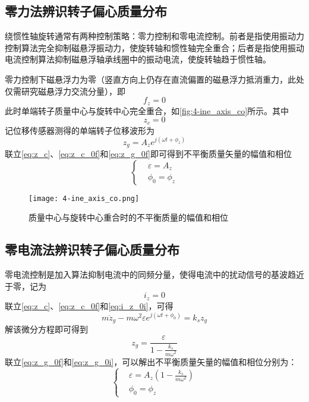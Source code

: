 \subsection{零力法辨识转子偏心质量分布}

绕惯性轴旋转通常有两种控制策略：零力控制和零电流控制。前者是指使用振动力控制算法完全抑制磁悬浮振动力，使旋转轴和惯性轴完全重合；后者是指使用振动电流控制算法抑制磁悬浮轴承线圈中的振动电流，使旋转轴趋于惯性轴。

零力控制下磁悬浮力为零（竖直方向上仍存在直流偏置的磁悬浮力抵消重力，此处仅需研究磁悬浮力交流分量），即
\begin{equation}
	\label{eq:f_z_0f}
	f_z = 0
\end{equation}
此时单端转子质量中心与旋转中心完全重合，如\autoref{fig:4-ine_axis_co}所示。其中
\begin{equation}
	\label{eq:z_c_0f}
	z_c = 0
\end{equation}
记位移传感器测得的单端转子位移波形为
\begin{equation}
	\label{eq:z_g_0f}
	z_g = A_ze^{j(\omega t + \phi _z)}
\end{equation}
联立\autoref{eq:z_c}、\autoref{eq:z_c_0f}和\autoref{eq:z_g_0f}即可得到不平衡质量矢量的幅值和相位
\begin{equation}
\left\{
\begin{aligned}
& \varepsilon = A_z\\
& \phi _0 = \phi _z
\end{aligned}
\right.
\end{equation}

\begin{figure}
	\texttt{[image: 4-ine\_axis\_co.png]}
	\caption{质量中心与旋转中心重合时的不平衡质量的幅值和相位}
	\label{fig:4-ine_axis_co}
\end{figure}


\subsection{零电流法辨识转子偏心质量分布}

零电流控制是加入算法抑制电流中的同频分量，使得电流中的扰动信号的基波趋近于零，记为
\begin{equation}
	\label{eq:i_z_0i}
	i_z = 0
\end{equation}
联立\autoref{eq:z_c}、\autoref{eq:z_c_0f}和\autoref{eq:i_z_0i}，可得
\begin{equation}
	\label{eq:0i_eq}
	m{\ddot{z}}_g - m{\omega}^2\varepsilon e^{j (\omega t + \phi _0)} = k_sz_g 
\end{equation}
解该微分方程即可得到
\begin{equation}
	\label{eq:z_g_0i}
	z_g = \frac{\varepsilon}{1-\frac{k_s}{m{\omega}^2}}
\end{equation}
联立\autoref{eq:z_g_0f}和\autoref{eq:z_g_0i}，可以解出不平衡质量矢量的幅值和相位分别为：
\begin{equation}
\label{eq:z_delta_0i}
\left\{
\begin{aligned}
& \varepsilon = A_z\left( 1 -\frac{k_s}{m{\omega}^2} \right) \\
& \phi _0 = \phi _z
\end{aligned}
\right.
\end{equation}


